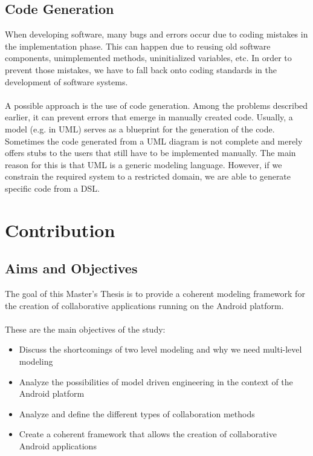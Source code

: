 \subsection{Code Generation}

When developing software, many bugs and errors occur due to coding mistakes in the implementation phase. This can happen due to reusing old software components, unimplemented methods, uninitialized variables, etc. In order to prevent those mistakes, we have to fall back onto coding standards in the development of software systems.
\\ \\
A possible approach is the use of code generation. Among the problems described earlier, it can prevent errors that emerge in manually created code. Usually, a model (e.g. in UML) serves as a blueprint for the generation of the code. Sometimes the code generated from a UML diagram is not complete and merely offers stubs to the users that still have to be implemented manually. The main reason for this is that UML is a generic modeling language. However, if we constrain the required system to a restricted domain, we are able to generate specific code from a DSL. 

\section{Contribution}

\subsection{Aims and Objectives}

The goal of this Master's Thesis is to provide a coherent modeling framework for the creation of collaborative applications running on the Android platform. 
\\ \\
These are the main objectives of the study:

\begin{itemize}
\item{Discuss the shortcomings of two level modeling and why we need multi-level modeling}
\item{Analyze the possibilities of model driven engineering in the context of the Android platform}
\item{Analyze and define the different types of collaboration methods}
\item{Create a coherent framework that allows the creation of collaborative Android applications}
\end{itemize}


